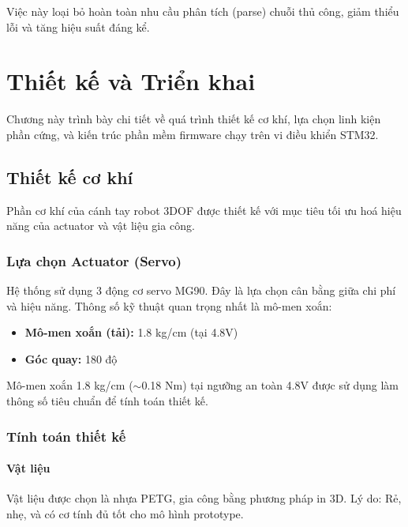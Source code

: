 \documentclass[12pt, a4paper, oneside]{report}
\numberwithin{equation}{chapter} %
\numberwithin{figure}{chapter}   %
\numberwithin{table}{chapter}    %
\begin{document}
Việc này loại bỏ hoàn toàn nhu cầu phân tích (parse) chuỗi thủ công, giảm thiểu lỗi và tăng hiệu suất đáng kể.


\chapter{Thiết kế và Triển khai}

Chương này trình bày chi tiết về quá trình thiết kế cơ khí, lựa chọn linh kiện phần cứng, và kiến trúc phần mềm firmware chạy trên vi điều khiển STM32.

\section{Thiết kế cơ khí}
Phần cơ khí của cánh tay robot 3DOF được thiết kế với mục tiêu tối ưu hoá hiệu năng của actuator và vật liệu gia công.

\subsection{Lựa chọn Actuator (Servo)}
Hệ thống sử dụng 3 động cơ servo MG90. Đây là lựa chọn cân bằng giữa chi phí và hiệu năng. Thông số kỹ thuật quan trọng nhất là mô-men xoắn:
\begin{itemize}
    \item \textbf{Mô-men xoắn (tải):} 1.8 kg/cm (tại 4.8V)
    \item \textbf{Góc quay:} 180 độ
\end{itemize}
Mô-men xoắn 1.8 kg/cm ($\sim$0.18 Nm) tại ngưỡng an toàn 4.8V được sử dụng làm thông số tiêu chuẩn để tính toán thiết kế.

\subsection{Tính toán thiết kế}
\subsubsection{Vật liệu}
Vật liệu được chọn là nhựa PETG, gia công bằng phương pháp in 3D. Lý do: Rẻ, nhẹ, và có cơ tính đủ tốt cho mô hình prototype.
\end{document}
